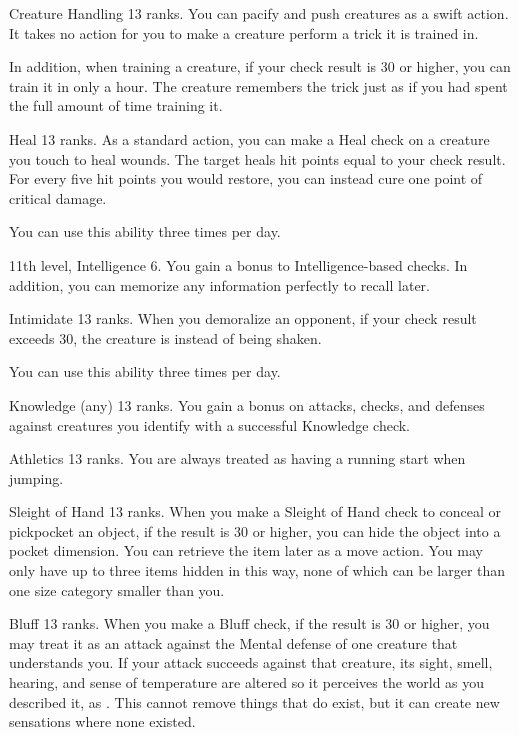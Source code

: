 \featpre Creature Handling 13 ranks.
\featben You can pacify and push creatures as a swift action.
It takes no action for you to make a creature perform a trick it is trained in.

In addition, when training a creature, if your check result is 30 or higher, you can train it in only a hour.
The creature remembers the trick just as if you had spent the full amount of time training it.

\featpre Heal 13 ranks.
\featben As a standard action, you can make a Heal check on a creature you touch to heal wounds.
The target heals hit points equal to your check result.
For every five hit points you would restore, you can instead cure one point of critical damage.

You can use this ability three times per day.

\featpres 11th level, Intelligence 6.
\featben You gain a  bonus to Intelligence-based checks.
In addition, you can memorize any information perfectly to recall later.

\featpre Intimidate 13 ranks.
\featben When you demoralize an opponent, if your check result exceeds 30, the creature is \panicked instead of being shaken.

You can use this ability three times per day.

\featpre Knowledge (any) 13 ranks.
\featben You gain a  bonus on attacks, checks, and defenses against creatures you identify with a successful Knowledge check.

\featpre Athletics 13 ranks.
\featben You are always treated as having a running start when jumping.

\featpre Sleight of Hand 13 ranks.
\featben When you make a Sleight of Hand check to conceal or pickpocket an object, if the result is 30 or higher, you can hide the object into a pocket dimension.
You can retrieve the item later as a move action.
You may only have up to three items hidden in this way, none of which can be larger than one size category smaller than you.

\featpre Bluff 13 ranks.
\featben When you make a Bluff check, if the result is 30 or higher, you may treat it as an attack against the Mental defense of one creature that understands you.
If your attack succeeds against that creature, its sight, smell, hearing, and sense of temperature are altered so it perceives the world as you described it, as .
This cannot remove things that do exist, but it can create new sensations where none existed.

